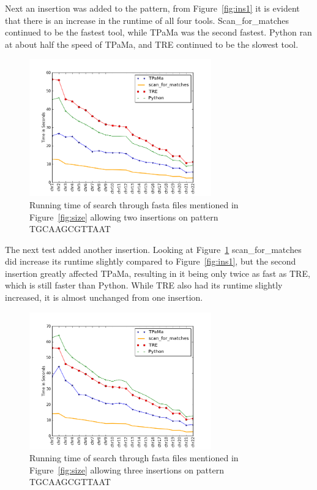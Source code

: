 Next an insertion was added to the pattern, from Figure~\ref{fig:ins1} it is evident that there is an increase in the runtime of all four tools. Scan\_for\_matches continued to be the fastest tool, while TPaMa was the second fastest. Python ran at about half the speed of TPaMa, and TRE continued to be the slowest tool.

\begin{figure}[h!]
\centering
\includegraphics[width=0.7\textwidth]{Benchmarking/2ins.png}
\caption{Running time of search through fasta files mentioned in Figure~\ref{fig:size} allowing two insertions on pattern TGCAAGCGTTAAT}
\label{fig:ins2}
\end{figure}

The next test added another insertion. Looking at Figure~\ref{fig:ins2} scan\_for\_matches did increase its runtime slightly compared to Figure~\ref{fig:ins1}, but the second insertion greatly affected TPaMa, resulting in it being only twice as fast as TRE, which is still faster than Python.  While TRE also had its runtime slightly increased, it is almost unchanged from one insertion.

\begin{figure}[h!]
\centering
\includegraphics[width=0.7\textwidth]{Benchmarking/3ins.png}
\caption{Running time of search through fasta files mentioned in Figure~\ref{fig:size} allowing three insertions on pattern TGCAAGCGTTAAT}
\label{fig:ins3}
\end{figure}

